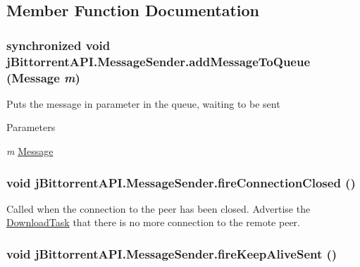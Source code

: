 \subsection{Member Function Documentation}
\hypertarget{classj_bittorrent_a_p_i_1_1_message_sender_af5abb658e232e429343c8deff1569736}{
\subsubsection[{addMessageToQueue}]{\setlength{\rightskip}{0pt plus 5cm}synchronized void jBittorrentAPI.MessageSender.addMessageToQueue ({\bf Message} {\em m})}}
\label{classj_bittorrent_a_p_i_1_1_message_sender_af5abb658e232e429343c8deff1569736}
Puts the message in parameter in the queue, waiting to be sent 
\begin{DoxyParams}{Parameters}
\item[{\em m}]\hyperlink{classj_bittorrent_a_p_i_1_1_message}{Message} \end{DoxyParams}
\hypertarget{classj_bittorrent_a_p_i_1_1_message_sender_a3323d46a5bd9b37824f3cdff188baf17}{
\subsubsection[{fireConnectionClosed}]{\setlength{\rightskip}{0pt plus 5cm}void jBittorrentAPI.MessageSender.fireConnectionClosed ()}}
\label{classj_bittorrent_a_p_i_1_1_message_sender_a3323d46a5bd9b37824f3cdff188baf17}
Called when the connection to the peer has been closed. Advertise the \hyperlink{classj_bittorrent_a_p_i_1_1_download_task}{DownloadTask} that there is no more connection to the remote peer. \hypertarget{classj_bittorrent_a_p_i_1_1_message_sender_a21a7fc624fa156b056028a36bbf136f8}{
\subsubsection[{fireKeepAliveSent}]{\setlength{\rightskip}{0pt plus 5cm}void jBittorrentAPI.MessageSender.fireKeepAliveSent ()}}
